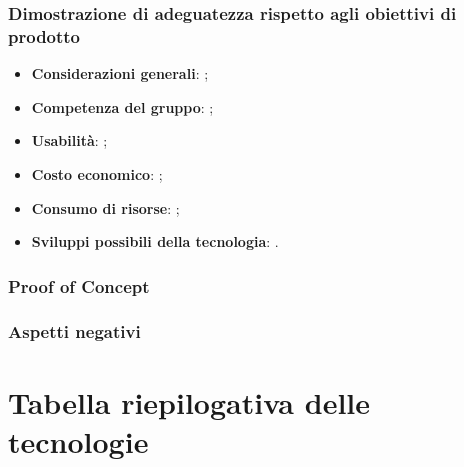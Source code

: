 \documentclass[./../Technology Baseline.tex]{subfiles}
\begin{document}
\subsubsection{Dimostrazione di adeguatezza rispetto agli obiettivi di prodotto}
\begin{itemize}
	\item \textbf{Considerazioni generali}: ;
	\item \textbf{Competenza del gruppo}: ;
	\item \textbf{Usabilità}: ;
	\item \textbf{Costo economico}: ;
	\item \textbf{Consumo di risorse}: ;
	\item \textbf{Sviluppi possibili della tecnologia}: .
\end{itemize}
\subsubsection{Proof of Concept}
\subsubsection{Aspetti negativi}
\section{Tabella riepilogativa delle tecnologie}
\end{document}
